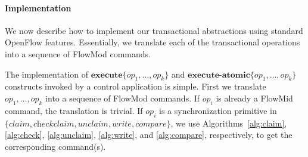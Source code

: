 \documentclass[conference]{sigcomm-alternate}
\newcommand{\liron}[1]{\textit{\textcolor{mygreen}{[liron]: #1}}} %
\newcommand{\exec}{\textbf{execute}}
\newcommand{\execatomic}{\textbf{execute-atomic}}
\begin{document}

\paragraph{Implementation}\label{sec:t-impl}
%
We now describe how to implement our transactional
abstractions using standard OpenFlow features.
Essentially, we translate each of the transactional operations into a
sequence of FlowMod commands.  

The implementation of $\exec\{op_1,\ldots,op_k\}$ and
$\execatomic\{op_1,\ldots,op_k\}$ constructs
invoked by a control application is simple.  
First we translate  $op_1,\ldots,op_k$ into a sequence of FlowMod
commands. If $op_i$ is already a FlowMid command, the translation is 
trivial. If $op_i$ is a synchronization primitive in
$\{\textit{claim},  \textit{checkclaim}, \textit{unclaim},
\textit{write}, \textit{compare}\}$, we use
Algorithms~\ref{alg:claim}, \ref{alg:check}, \ref{alg:unclaim},
\ref{alg:write}, and \ref{alg:compare}, respectively, to get the
corresponding command(s).   
\end{document}
